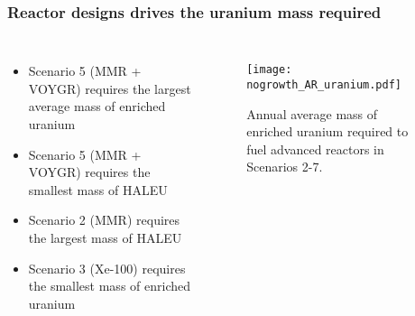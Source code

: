 \begin{frame}
    \frametitle{Reactor designs drives the uranium mass required}
    \begin{columns}
        \column[t]{4.5cm}
            \begin{itemize}
                \item Scenario 5 (MMR + VOYGR) requires the largest average mass of 
                      enriched uranium
                \item Scenario 5 (MMR + VOYGR) requires the smallest mass of \gls{HALEU}
                \item Scenario 2 (MMR) requires the largest mass of \gls{HALEU}
                \item Scenario 3 (Xe-100) requires the smallest mass of enriched 
                      uranium
                \end{itemize}
        \column[t]{6.3cm}
        \vspace{-0.8cm}
            \begin{figure}
                \centering
                \texttt{[image: nogrowth\_AR\_uranium.pdf]}
                \caption{Annual average mass of enriched uranium required to fuel
                advanced reactors in Scenarios 2-7.}
                \label{fig:ot_uranium}

        \end{figure}
    \end{columns}
\end{frame}

